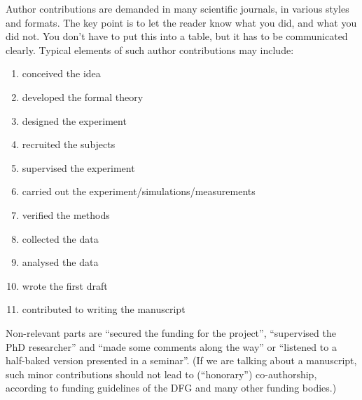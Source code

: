 Author contributions are demanded in many scientific journals, in various styles and formats. The key point is to let the reader know what you did, and what you did not. You don't have to put this into a table, but it has to be communicated clearly. Typical elements of such author contributions may include:
\begin{enumerate}
	\item conceived the idea
	\item developed the formal theory
	\item designed the experiment
	\item recruited the subjects
	\item supervised the experiment
	\item carried out the experiment/simulations/measurements
	\item verified the methods
	\item collected the data
	\item analysed the data
	\item wrote the first draft
	\item contributed to writing the manuscript
\end{enumerate}
Non-relevant parts are ``secured the funding for the project'', ``supervised the PhD researcher'' and ``made some comments along the way'' or ``listened to a half-baked version presented in a seminar''. (If we are talking about a manuscript, such minor contributions should not lead to (``honorary'') co-authorship, according to funding guidelines of the DFG and many other funding bodies.)